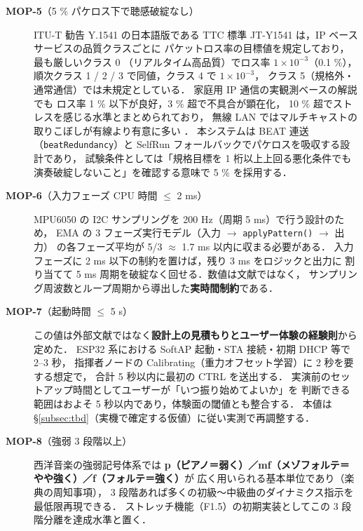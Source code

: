 \documentclass[lualatex,book,paper=a4paper,jafontsize=11.5pt,jafontscale=1.05]{jlreq}
\begin{document}
\begin{description}
  \item[\textmd{\textbf{MOP-5}}（5 \% パケロス下で聴感破綻なし）]
        ITU-T 勧告 Y.1541 の日本語版である TTC 標準 JT-Y1541
        \cite{ttc_y1541} は，IP ベースサービスの品質クラスごとに
        パケットロス率の目標値を規定しており，最も厳しいクラス 0
        （リアルタイム高品質）でロス率 \textbf{$1\times 10^{-3}$}（0.1 \%），
        順次クラス 1 / 2 / 3 で同値，クラス 4 で $1\times 10^{-3}$，
        クラス 5（規格外・通常通信）では未規定としている．
        家庭用 IP 通信の実観測ベースの解説 \cite{eo_packet_loss} でも
        ロス率 1 \% 以下が良好，3 \% 超で不具合が顕在化，
        10 \% 超でストレスを感じる水準とまとめられており，
        無線 LAN ではマルチキャストの取りこぼしが有線より有意に多い
        \cite{dena_wifi2018}．
        本システムは BEAT 連送（\texttt{beatRedundancy}）と SelfRun
        フォールバックでパケロスを吸収する設計であり，
        試験条件としては「規格目標を 1 桁以上上回る悪化条件でも
        演奏破綻しないこと」を確認する意味で 5 \% を採用する．

  \item[\textmd{\textbf{MOP-6}}（入力フェーズ CPU 時間 $\leq$ 2 ms）]
        MPU6050 の I2C サンプリングを 200 Hz（周期 5 ms）で行う設計のため，
        EMA の 3 フェーズ実行モデル（入力 $\to$ \texttt{applyPattern()} $\to$ 出力）
        の各フェーズ平均が 5/3 $\approx$ 1.7 ms 以内に収まる必要がある．
        入力フェーズに 2 ms 以下の制約を置けば，残り 3 ms をロジックと出力に
        割り当てて 5 ms 周期を破綻なく回せる．数値は文献ではなく，
        サンプリング周波数とループ周期から導出した\textbf{実時間制約}である．

  \item[\textmd{\textbf{MOP-7}}（起動時間 $\leq$ 5 s）]
        この値は外部文献ではなく\textbf{設計上の見積もりとユーザー体験の経験則}から定めた．
        ESP32 系における SoftAP 起動・STA 接続・初期 DHCP 等で 2--3 秒，
        指揮者ノードの Calibrating（重力オフセット学習）に 2 秒を要する想定で，
        合計 5 秒以内に最初の CTRL を送出する．
        実演前のセットアップ時間としてユーザーが「いつ振り始めてよいか」を
        判断できる範囲はおよそ 5 秒以内であり，体験面の閾値とも整合する．
        本値は \S\ref{subsec:tbd}（実機で確定する仮値）に従い実測で再調整する．

  \item[\textmd{\textbf{MOP-8}}（強弱 3 段階以上）]
        西洋音楽の強弱記号体系では
        \textbf{p（ピアノ＝弱く）／mf（メゾフォルテ＝やや強く）／f（フォルテ＝強く）}が
        広く用いられる基本単位であり（楽典の周知事項），
        3 段階あれば多くの初級〜中級曲のダイナミクス指示を最低限再現できる．
        ストレッチ機能（F1.5）の初期実装としてこの 3 段階分離を達成水準と置く．
\end{description}
\end{document}
